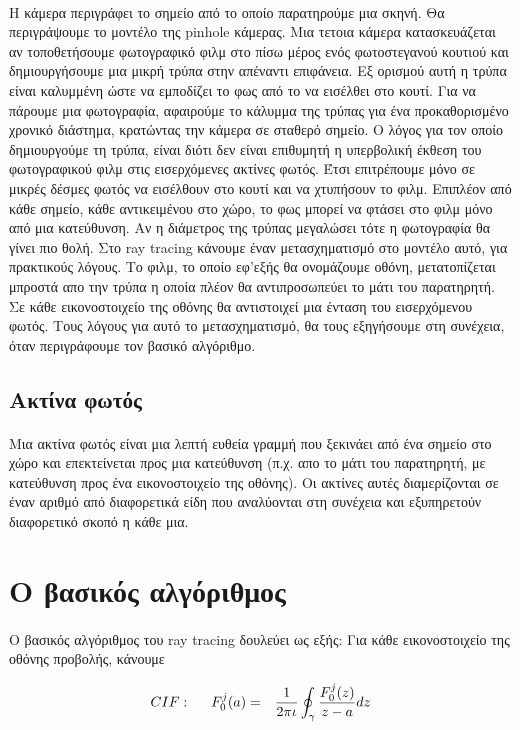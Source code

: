 \begin{sloppypar}
\paragraph{}
	H κάμερα περιγράφει το σημείο από το οποίο παρατηρούμε μια σκηνή. Θα περιγράψουμε το μοντέλο της pinhole
κάμερας. Μια τετοια κάμερα κατασκευάζεται αν τοποθετήσουμε φωτογραφικό φιλμ στο πίσω μέρος ενός φωτοστεγανού κουτιού 
και δημιουργήσουμε μια μικρή τρύπα στην απέναντι επιφάνεια. Εξ ορισμού αυτή η τρύπα είναι καλυμμένη ώστε να 
εμποδίζει το φως από το να εισέλθει στο κουτί. Για να πάρουμε μια φωτογραφία, αφαιρούμε το κάλυμμα της τρύπας 
για ένα προκαθορισμένο χρονικό διάστημα, κρατώντας την κάμερα σε σταθερό σημείο. Ο λόγος για τον οποίο δημιουργούμε 
τη τρύπα, είναι διότι δεν είναι επιθυμητή η υπερβολική έκθεση του φωτογραφικού φιλμ στις εισερχόμενες ακτίνες φωτός. 
Έτσι επιτρέπουμε μόνο σε μικρές δέσμες φωτός να εισέλθουν στο κουτί και να χτυπήσουν το φιλμ. Επιπλέον από κάθε 
σημείο, κάθε αντικειμένου στο χώρο, το φως μπορεί να φτάσει στο φιλμ μόνο από μια κατεύθυνση. Αν η διάμετρος 
της τρύπας μεγαλώσει τότε η φωτογραφία θα γίνει πιο θολή. Στο ray tracing κάνουμε έναν μετασχηματισμό στο μοντέλο
αυτό, για πρακτικούς λόγους. Το φιλμ, το οποίο εφ'εξής θα ονομάζουμε οθόνη, μετατοπίζεται μπροστά απο την τρύπα η 
οποία πλέον θα αντιπροσωπεύει το μάτι του παρατηρητή. Σε κάθε εικονοστοιχείο της οθόνης θα αντιστοιχεί μια ένταση
του εισερχόμενου φωτός. Τους λόγους για αυτό το μετασχηματισμό, θα τους εξηγήσουμε στη συνέχεια, όταν περιγράφουμε
τον βασικό αλγόριθμο.

\subsection{Ακτίνα φωτός}
\paragraph{}
	Μια ακτίνα φωτός είναι μια λεπτή ευθεία γραμμή που ξεκινάει από ένα σημείο στο χώρο και επεκτείνεται προς 
μια κατεύθυνση (π.χ. απο το μάτι του παρατηρητή, με κατεύθυνση προς ένα εικονοστοιχείο της οθόνης). Οι ακτίνες αυτές 
διαμερίζονται σε έναν αριθμό από διαφορετικά είδη που αναλύονται στη συνέχεια και εξυπηρετούν διαφορετικό σκοπό η κάθε μια.

\section{Ο βασικός αλγόριθμος}
\paragraph{}	
	O βασικός αλγόριθμος του ray tracing δουλεύει ως εξής: Για κάθε εικονοστοιχείο της οθόνης προβολής, κάνουμε 


\begin{eqnarray}
CIF: \hspace*{5mm}F_0^j(a) &=& \frac{1}{2\pi \iota} \oint_{\gamma} \frac{F_0^j(z)}{z - a} dz
\end{eqnarray}

\end{sloppypar}

